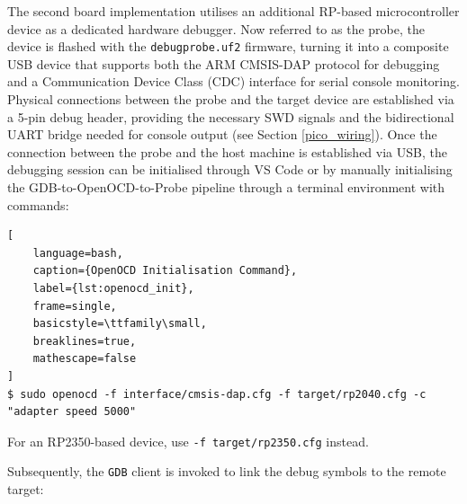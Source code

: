 The second board implementation utilises an additional RP-based microcontroller device as a dedicated hardware debugger. Now referred to as the probe, the device is flashed with the \texttt{debugprobe.uf2} firmware, turning it into a composite USB device that supports both the ARM CMSIS-DAP protocol for debugging and a Communication Device Class (CDC) interface for serial console monitoring. Physical connections between the probe and the target device are established via a 5-pin debug header, providing the necessary SWD signals and the bidirectional UART bridge needed for console output (see Section \ref{pico_wiring}). Once the connection between the probe and the host machine is established via USB, the debugging session can be initialised through VS Code or by manually initialising the GDB-to-OpenOCD-to-Probe pipeline through a terminal environment with commands\cite{pico_getting_started}:
\begin{lstlisting}[
    language=bash,
    caption={OpenOCD Initialisation Command},
    label={lst:openocd_init},
    frame=single,
    basicstyle=\ttfamily\small,
    breaklines=true,
    mathescape=false
]
$ sudo openocd -f interface/cmsis-dap.cfg -f target/rp2040.cfg -c "adapter speed 5000"
\end{lstlisting}

For an RP2350-based device, use \texttt{-f target/rp2350.cfg} instead.

Subsequently, the \texttt{GDB} client is invoked to link the debug symbols to the remote target:

